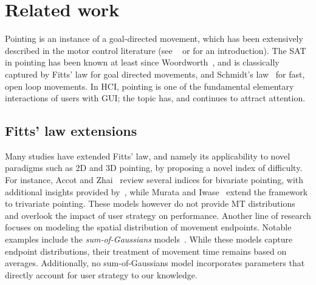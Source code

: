 \documentclass[acmlarge, manuscript,review]{acmart}
\begin{document}
\section{Related work\label{sec:rw}}
Pointing is an instance of a goal-directed movement, which has been extensively described in the motor control literature (see \eg~\cite[Section 2]{todorov1998} or \cite{elliott2017} for an introduction). The SAT in pointing has been known at least since Woordworth~\cite{woodworth1899}, and is classically captured by Fitts' law for goal directed movements, and Schmidt's law~\cite{schmidt1979} for fast, open loop movements.
In HCI, pointing is one of the fundamental elementary interactions of users with GUI; the topic has, and continues to attract attention.


\subsection{Fitts' law extensions}
Many studies have extended Fitts' law, and namely its applicability to novel paradigms such as 2D and 3D pointing, by proposing a novel index of difficulty.
For instance, Accot and Zhai~\cite{accot2003} review several indices for bivariate pointing, with additional insights provided by~\cite{grossman2005b}, while Murata and Iwase~\cite{murata2001} extend the framework to trivariate pointing. 
These models however do not provide MT distributions and overlook the impact of user strategy on performance. 
Another line of research focuses on modeling the spatial distribution of movement endpoints. Notable examples include the \textit{sum-of-Gaussians} models~\cite{bi2013, yamanaka2020, zhang2023}. While these models capture endpoint distributions, their treatment of movement time remains based on averages. Additionally, no sum-of-Gaussians model incorporates parameters that directly account for user strategy to our knowledge.


\end{document}
